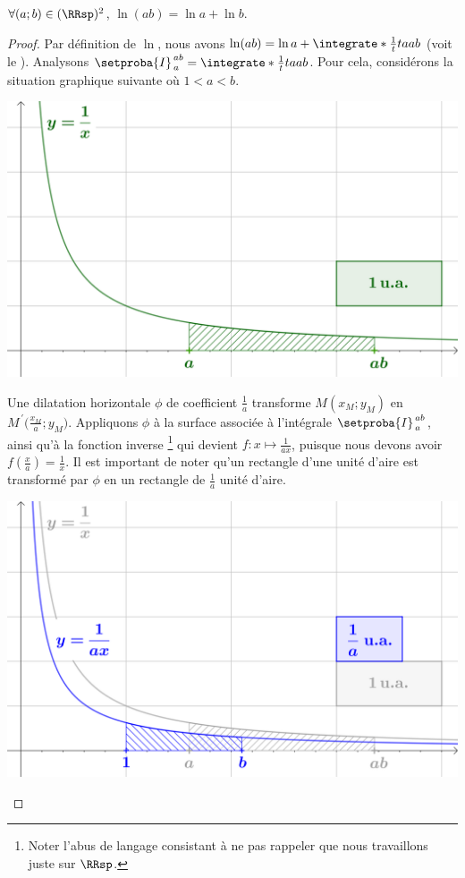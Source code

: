 \begin{fact}
	$\forall (a;b) \in ( \RRsp )^2$,
	$\ln(a b) = \ln a + \ln b$.
\end{fact}


\begin{proof}
	Par définition de $\ln$, nous avons 
	$\ln(a b) = \ln a + \integrate*{\frac1t}{t}{a}{ab}$
	(voit le ).
	Analysons $\setproba{I}_{\,a}^{\,ab} = \integrate*{\frac1t}{t}{a}{ab}$.
	Pour cela, considérons la situation graphique suivante où $1 < a < b$.
	
	\begin{center}
		\includegraphics[scale=.5]{content/ln/func-eq-1.png}
	\end{center}

	Une dilatation horizontale $\phi$ de coefficient $\frac1a$ transforme $M(x_M ; y_M)$ en $M^{\,\prime}\big( \frac{x_M}{a} ; y_M)$. 
	Appliquons $\phi$ à la surface associée à l'intégrale $\setproba{I}_{\,a}^{\,ab}$, ainsi qu'à la fonction inverse%
	\footnote{
		Noter l'abus de langage consistant à ne pas rappeler que nous travaillons juste sur $\RRsp$.
	}
	qui devient $f: x \mapsto \frac{1}{a x}$, puisque nous devons avoir $f(\frac{x}{a}) = \frac{1}{x}$. 
	Il est important de noter qu'un rectangle d'une unité d'aire est transformé par $\phi$ en un rectangle de $\frac1a$ unité d'aire.

	\begin{center}
		\includegraphics[scale=.5]{content/ln/func-eq-2.png}
	\end{center}


\end{proof}
